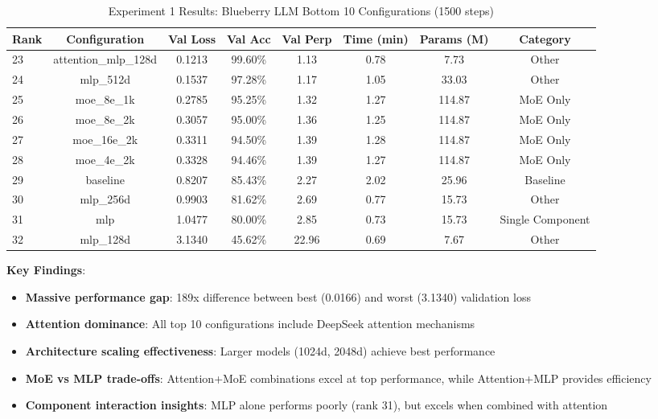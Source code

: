 \documentclass[11pt,a4paper]{article}
\begin{document}
\begin{table}[H]
\centering
\caption{Experiment 1 Results: Blueberry LLM Bottom 10 Configurations (1500 steps)}
\label{tab:exp1_bottom}
\begin{tabular}{@{}lccccccc@{}}
\toprule
Rank & Configuration & Val Loss & Val Acc & Val Perp & Time (min) & Params (M) & Category \\
\midrule
23 & attention\_mlp\_128d & 0.1213 & 99.60\% & 1.13 & 0.78 & 7.73 & Other \\
24 & mlp\_512d & 0.1537 & 97.28\% & 1.17 & 1.05 & 33.03 & Other \\
25 & moe\_8e\_1k & 0.2785 & 95.25\% & 1.32 & 1.27 & 114.87 & MoE Only \\
26 & moe\_8e\_2k & 0.3057 & 95.00\% & 1.36 & 1.25 & 114.87 & MoE Only \\
27 & moe\_16e\_2k & 0.3311 & 94.50\% & 1.39 & 1.28 & 114.87 & MoE Only \\
28 & moe\_4e\_2k & 0.3328 & 94.46\% & 1.39 & 1.27 & 114.87 & MoE Only \\
29 & baseline & 0.8207 & 85.43\% & 2.27 & 2.02 & 25.96 & Baseline \\
30 & mlp\_256d & 0.9903 & 81.62\% & 2.69 & 0.77 & 15.73 & Other \\
31 & mlp & 1.0477 & 80.00\% & 2.85 & 0.73 & 15.73 & Single Component \\
32 & mlp\_128d & 3.1340 & 45.62\% & 22.96 & 0.69 & 7.67 & Other \\
\bottomrule
\end{tabular}
\end{table}

\textbf{Key Findings}:
\begin{itemize}
    \item \textbf{Massive performance gap}: 189x difference between best (0.0166) and worst (3.1340) validation loss
    \item \textbf{Attention dominance}: All top 10 configurations include DeepSeek attention mechanisms
    \item \textbf{Architecture scaling effectiveness}: Larger models (1024d, 2048d) achieve best performance
    \item \textbf{MoE vs MLP trade-offs}: Attention+MoE combinations excel at top performance, while Attention+MLP provides efficiency
    \item \textbf{Component interaction insights}: MLP alone performs poorly (rank 31), but excels when combined with attention
\end{itemize}
\end{document}
